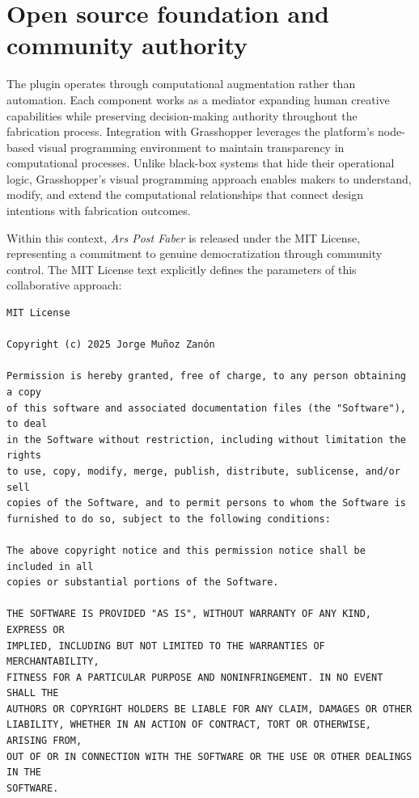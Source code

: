 \section{Open source foundation and community authority}

The plugin operates through computational augmentation rather than automation. Each component works as a mediator expanding human creative capabilities while preserving decision-making authority throughout the fabrication process. Integration with Grasshopper leverages the platform's node-based visual programming environment to maintain transparency in computational processes. Unlike black-box systems that hide their operational logic, Grasshopper's visual programming approach enables makers to understand, modify, and extend the computational relationships that connect design intentions with fabrication outcomes.

\vspace{0.5cm}

Within this context, \textit{Ars Post Faber} is released under the MIT License, representing a commitment to genuine democratization through community control. The MIT License text explicitly defines the parameters of this collaborative approach:

\vspace{0.5cm}

\begin{verbatim}
MIT License

Copyright (c) 2025 Jorge Muñoz Zanón

Permission is hereby granted, free of charge, to any person obtaining a copy
of this software and associated documentation files (the "Software"), to deal
in the Software without restriction, including without limitation the rights
to use, copy, modify, merge, publish, distribute, sublicense, and/or sell
copies of the Software, and to permit persons to whom the Software is
furnished to do so, subject to the following conditions:

The above copyright notice and this permission notice shall be included in all
copies or substantial portions of the Software.

THE SOFTWARE IS PROVIDED "AS IS", WITHOUT WARRANTY OF ANY KIND, EXPRESS OR
IMPLIED, INCLUDING BUT NOT LIMITED TO THE WARRANTIES OF MERCHANTABILITY,
FITNESS FOR A PARTICULAR PURPOSE AND NONINFRINGEMENT. IN NO EVENT SHALL THE
AUTHORS OR COPYRIGHT HOLDERS BE LIABLE FOR ANY CLAIM, DAMAGES OR OTHER
LIABILITY, WHETHER IN AN ACTION OF CONTRACT, TORT OR OTHERWISE, ARISING FROM,
OUT OF OR IN CONNECTION WITH THE SOFTWARE OR THE USE OR OTHER DEALINGS IN THE
SOFTWARE.
\end{verbatim}


